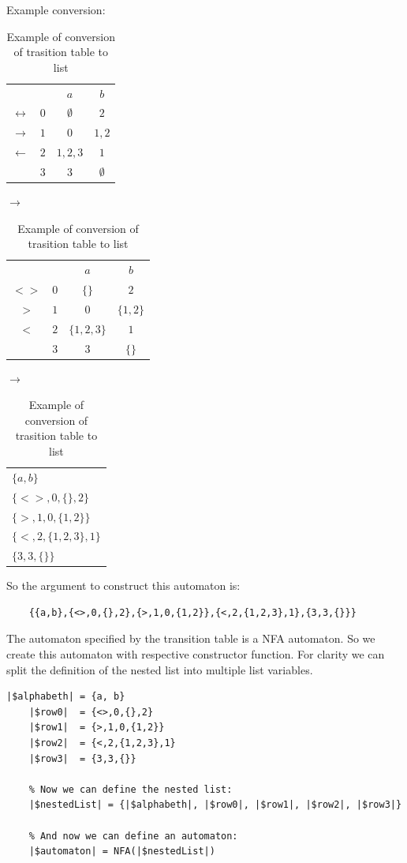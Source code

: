 \documentclass{ctuthesis}
\begin{document}
Example conversion:
\begin{table}[H]
\begin{ctucolortab}
\begin{tabular}{cc|cc}
	&	& $a$	& $b$ \\\Midrule
$\leftrightarrow$	& $0$	& $\emptyset$	& $2$ \\
$\rightarrow$	& $1$ & $0$ & $1,2$ \\
$\leftarrow$	& $2$ & $1,2,3$ & $1$ \\
				& $3$ & $3$	& $\emptyset$ 
\end{tabular}
\quad
$\rightarrow$
\begin{tabular}{|c|c|c|c|}
\hline
	&&$a$&$b$ \\
	$<>$ & $0$ & $\{\}$ & $2$ \\
	$>$ & $1$ & $0$ & $\{1,2\}$ \\
	$<$ & $2$ & $\{1,2,3\}$ & $1$ \\
		& $3$ & $3$ & $\{\}$\\
		\hline
\end{tabular}
\quad 
$\rightarrow$
\begin{tabular}{|l|}
\hline 
$\{a, b\}$ \\
$\{<>,0,\{\}, 2\}$ \\
$\{>,1,0,\{1,2\}\}$ \\
$\{<,2,\{1,2,3\},1\}$ \\
$\{3, 3, \{\}\}$ \\\hline
\end{tabular}
\end{ctucolortab}
\caption{Example of conversion of trasition table to list}
\label{fig:example_conversion}
\end{table}

So the argument to construct this automaton is:
\begin{verbatim}
	{{a,b},{<>,0,{},2},{>,1,0,{1,2}},{<,2,{1,2,3},1},{3,3,{}}}
\end{verbatim}

The automaton specified by the transition table is a NFA automaton. So we create this automaton with respective constructor function. For clarity we can split the definition of the nested list into multiple list variables. 

\begin{minipage}{\linewidth}
\begin{lstlisting}[language = JASL]
	|$alphabeth| = {a, b}
	|$row0|  = {<>,0,{},2}
	|$row1|  = {>,1,0,{1,2}}
	|$row2|  = {<,2,{1,2,3},1}
	|$row3|  = {3,3,{}}
	
	% Now we can define the nested list:
	|$nestedList| = {|$alphabeth|, |$row0|, |$row1|, |$row2|, |$row3|}
    
	% And now we can define an automaton:
	|$automaton| = NFA(|$nestedList|)
\end{lstlisting}
\end{minipage}
\end{document}
